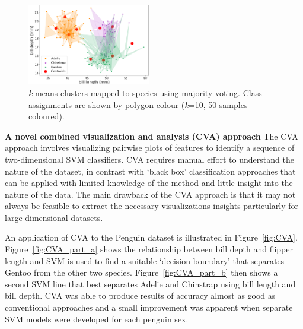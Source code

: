 \documentclass[12pt]{article}
\begin{document}
\begin{figure} %
  \centering
  \vspace{-1\baselineskip} %
  \includegraphics[width=0.48\textwidth]{kmeansmap.png} %
  \vspace{-0.5\baselineskip} %
  \caption{\textit{k}-means clusters mapped to species using majority voting. 
  Class assignments are shown by polygon colour (\textit{k}=10, 50 samples coloured).}
  \vspace{-0.5\baselineskip} %
  \label{fig:kmeansmap}
\end{figure}

\textbf{A novel combined visualization and analysis (CVA) approach}  
The CVA approach involves visualizing pairwise plots of features 
to identify a sequence of two-dimensional SVM classifiers. 
CVA requires manual effort to understand the nature of the dataset, 
in contrast with `black box' classification approaches that can be applied with limited knowledge 
of the method and little insight into the nature of the data. 
The main drawback of the CVA approach is that it may not always be feasible to extract the necessary visualizations insights 
particularly for large dimensional datasets. 

An application of CVA to the Penguin dataset is illustrated in Figure~\ref{fig:CVA}. 
Figure~\ref{fig:CVA_part_a} shows the relationship between bill depth and flipper length and 
SVM is used to find a suitable `decision boundary' that separates Gentoo from the other two species. 
Figure~\ref{fig:CVA_part_b} then shows a second SVM line that best separates Adelie and Chinstrap using bill length and bill depth. 
CVA was able to produce results of accuracy almost as good as conventional approaches and a small improvement 
was apparent when separate SVM models were developed for each penguin sex.
\end{document}
